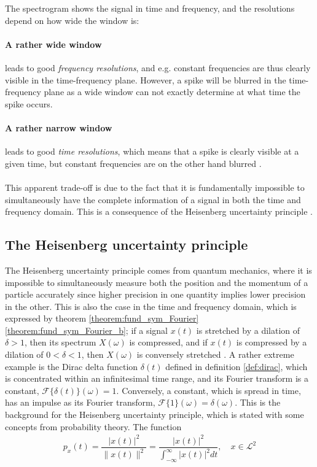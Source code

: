 The spectrogram shows the signal in time and frequency, and the resolutions depend on how wide the window is:

\paragraph{A rather wide window} leads to good \textit{frequency resolutions}, and e.g. constant frequencies are thus clearly visible in the time-frequency plane. However, a spike will be blurred in the time-frequency plane as a wide window can not exactly determine at what time the spike occurs.
\paragraph{A rather narrow window} leads to good \textit{time resolutions}, which means that a spike is clearly visible at a given time, but constant frequencies are on the other hand blurred \cite{Davis}.
\\ \\
This apparent trade-off is due to the fact that it is fundamentally impossible to simultaneously have the complete information of a signal in both the time and frequency domain. This is a consequence of the Heisenberg uncertainty principle \cite{page 409, Wang}.

\subsection{The Heisenberg uncertainty principle}\label{sec:heisenberg}
The Heisenberg uncertainty principle comes from quantum mechanics, where it is impossible to simultaneously measure both the position and the momentum of a particle accurately since higher precision in one quantity implies lower precision in the other. This is also the case in the time and frequency domain, which is expressed by theorem \ref{theorem:fund_sym_Fourier}  \ref{theorem:fund_sym_Fourier_b}; if a signal $x(t)$ is stretched by a dilation of $\delta > 1$, then its spectrum $X(\omega)$ is compressed, and if $x(t)$ is compressed by a dilation of $0 < \delta < 1$, then $X(\omega)$ is conversely stretched \cite{pages 123-124, 135, Wang}. A rather extreme example is the Dirac delta function $\delta(t)$ defined in definition \ref{def:dirac}, which is concentrated within an infinitesimal time range, and its Fourier transform is a constant, $\mathcal{F}\{\delta(t)\}(\omega) = 1$. Conversely, a constant, which is spread in time, has an impulse as its Fourier transform, $\mathcal{F}\{1\}(\omega) = \delta(\omega)$. This is the background for the Heisenberg uncertainty principle, which is stated with some concepts from probability theory. The function 
\begin{align*}
p_x(t) = \dfrac{|x(t)|^2}{\|x(t)\|^2} = \dfrac{|x(t)|^2}{\int_{-\infty}^\infty |x(t)|^2 dt}, \quad x \in \mathcal{L}^2
\end{align*}

